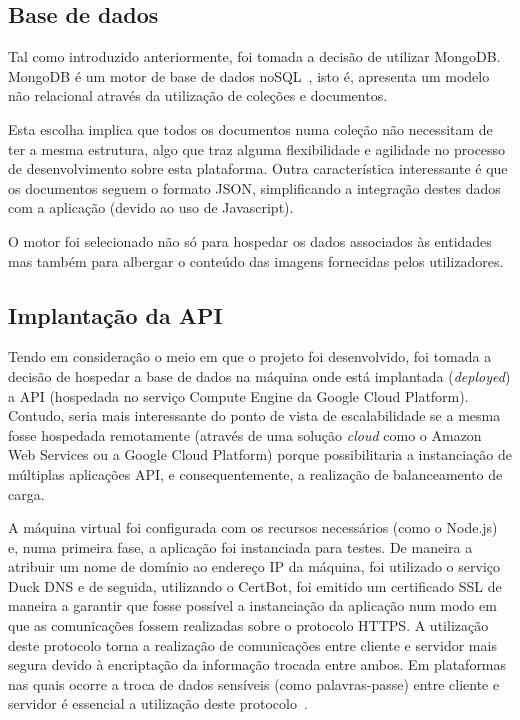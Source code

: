 \subsection{Base de dados}

Tal como introduzido anteriormente, foi tomada a decisão de utilizar MongoDB. MongoDB é um motor de base de dados noSQL~\cite{mongoDB2020}, isto é, apresenta um modelo não relacional através da utilização de coleções e documentos.

\medskip \par

Esta escolha implica que todos os documentos numa coleção não necessitam de ter a mesma estrutura, algo que traz alguma flexibilidade e agilidade no processo de desenvolvimento sobre esta plataforma. Outra característica interessante é que os documentos seguem o formato JSON, simplificando a integração destes dados com a aplicação (devido ao uso de Javascript).

\medskip \par

O motor foi selecionado não só para hospedar os dados associados às entidades mas também para albergar o conteúdo das imagens fornecidas pelos utilizadores.

\subsection{Implantação da API}

Tendo em consideração o meio em que o projeto foi desenvolvido, foi tomada a decisão de hospedar a base de dados na máquina onde está implantada (\textit{deployed}) a API (hospedada no serviço Compute Engine da Google Cloud Platform). Contudo, seria mais interessante do ponto de vista de escalabilidade se a mesma fosse hospedada remotamente (através de uma solução \textit{cloud} como o Amazon Web Services ou a Google Cloud Platform) porque possibilitaria a instanciação de múltiplas aplicações API, e consequentemente, a realização de balanceamento de carga.

\medskip \par

A máquina virtual foi configurada com os recursos necessários (como o Node.js) e, numa primeira fase, a aplicação foi instanciada para testes. De maneira a atribuir um nome de domínio ao endereço IP da máquina, foi utilizado o serviço Duck DNS e de seguida, utilizando o CertBot, foi emitido um certificado SSL de maneira a garantir que fosse possível a instanciação da aplicação num modo em que as comunicações fossem realizadas sobre o protocolo HTTPS. A utilização deste protocolo torna a realização de comunicações entre cliente e servidor mais segura devido à encriptação da informação trocada entre ambos. Em plataformas nas quais ocorre a troca de dados sensíveis (como palavras-passe) entre cliente e servidor é essencial a utilização deste protocolo~\cite{Cloudflare2020}.






